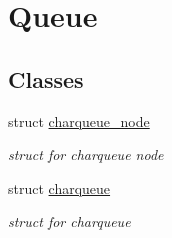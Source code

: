 \hypertarget{group__Queue}{}\section{Queue}
\label{group__Queue}
\subsection*{Classes}
\begin{DoxyCompactItemize}
\item 
struct \hyperlink{structcharqueue__node}{charqueue\+\_\+node}
\begin{DoxyCompactList}\small\item\em struct for charqueue node \end{DoxyCompactList}\item 
struct \hyperlink{structcharqueue}{charqueue}
\begin{DoxyCompactList}\small\item\em struct for charqueue \end{DoxyCompactList}\end{DoxyCompactItemize}
